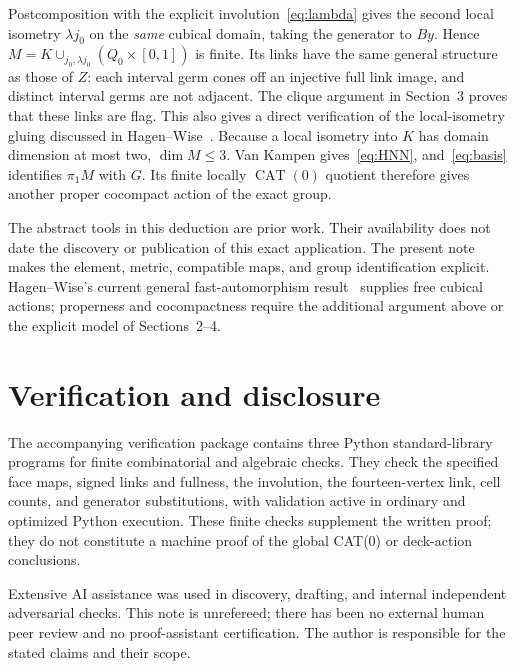 \documentclass[11pt]{article}
\newcommand{\CAT}{\operatorname{CAT}}
\begin{document}
Postcomposition with the explicit involution~\eqref{eq:lambda} gives
the second local isometry $\lambda j_0$ on the \emph{same} cubical
domain, taking the generator to $By$. Hence
$M=K\cup_{j_0,\lambda j_0}(Q_0\times[0,1])$ is finite. Its links
have the same general structure as those of $Z$: each interval germ
cones off an injective full link image, and distinct interval germs are
not adjacent. The clique argument in Section~3 proves that these links
are flag. This also gives a direct verification of the local-isometry
gluing discussed in Hagen--Wise~\cite[Remark~3.7]{HW}. Because a local
isometry into $K$ has domain dimension at most two, $\dim M\leq3$.
Van Kampen gives~\eqref{eq:HNN}, and~\eqref{eq:basis} identifies
$\pi_1M$ with $G$. Its finite locally $\CAT(0)$ quotient therefore
gives another proper cocompact action of the exact group.

The abstract tools in this deduction are prior work. Their availability
does not date the discovery or publication of this exact application.
The present note makes the element, metric, compatible maps, and group
identification explicit. Hagen--Wise's current general fast-automorphism
result~\cite[Corollary~7.2]{HW} supplies free cubical actions; properness
and cocompactness require the additional argument above or the explicit
model of Sections~2--4.

\section*{Verification and disclosure}

The accompanying verification package contains three Python standard-library
programs for finite combinatorial and algebraic checks. They check the
specified face maps, signed links and fullness, the involution, the
fourteen-vertex link, cell counts, and generator substitutions, with
validation active in ordinary and optimized Python execution. These
finite checks supplement the written proof; they do not constitute a
machine proof of the global CAT(0) or deck-action conclusions.

Extensive AI assistance was used in discovery, drafting, and internal
independent adversarial checks. This note is unrefereed; there has been
no external human peer review and no proof-assistant certification. The
author is responsible for the stated claims and their scope.
\end{document}
